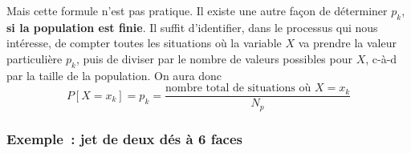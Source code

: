 Mais cette formule n'est pas pratique. Il existe une autre façon de déterminer $p_k$, \textbf{si la population est finie}. Il suffit d'identifier, dans le processus qui nous intéresse, de compter toutes les situations où la variable $X$ va prendre la valeur particulière $p_k$, puis de diviser par le nombre de valeurs possibles pour $X$, c-à-d par la taille de la population. On aura donc
\begin{equation}
P[X=x_k]=p_k=\frac{\text{nombre total de situations où $X=x_k$}}{N_p}
\label{eq:ddlp2}
\end{equation}

\subsubsection*{Exemple~: jet de deux dés à 6 faces}

